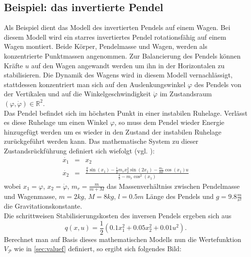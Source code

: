 \documentclass[12pt,a4paper,twoside]{article}
\begin{document}
	\subsection{Beispiel: das invertierte Pendel}
	Als Beispiel dient das Modell des invertierten Pendels auf einem Wagen. Bei diesem Modell wird ein starres 
	invertiertes Pendel rotationsfähig auf einem Wagen montiert. Beide Körper, Pendelmasse und Wagen, werden als 
	konzentrierte Punktmassen angenommen. Zur Balancierung des Pendels können Kräfte $u$ auf den Wagen angewandt 
	werden um ihn in der Horizontalen zu stabilisieren. Die Dynamik des Wagens wird in diesem Modell vernachlässigt, 
	stattdessen konzentriert man sich auf den Auslenkungswinkel $\varphi$ des Pendels von der Vertikalen und auf die 
	Winkelgeschwindigkeit $\dot{\varphi}$ im Zustandsraum $(\varphi,\dot{\varphi})\in \mathds{R}^2$. \\
	Das Pendel befindet sich im höchsten Punkt in einer instabilen Ruhelage. Verlässt es diese Ruhelage um einen 
	Winkel $\varphi$, so muss dem Pendel wieder Energie hinzugefügt werden um es wieder in den Zustand der instabilen 
	Ruhelage zurückgeführt werden kann. Das mathematische System zu dieser Zustandsrückführung definiert sich 
	wiefolgt (vgl. \citep{Grune2005}):
	\begin{eqnarray}
		\dot{x_1} &=& x_2 \\
		\dot{x_2} &=& \frac{\frac{g}{l}\sin (x_1)-\frac{1}{2}m_rx_2^2\sin (2x_1)-\frac{m_r}{ml}\cos (x_1)u}{\frac{4}{3}-m_r\cos ^2(x_1)}
	\end{eqnarray}
	wobei $x_1=\varphi$, $x_2=\dot{\varphi}$, $m_r=\frac{m}{m+M}$ das Massenverhältniss zwischen Pendelmasse und 
	Wagenmasse, $m=2kg$, $M=8kg$, $l=0.5m$ Länge des Pendels und $g=9.8\frac{m}{s^2}$ die Gravitationskonstante. \\
	Die schrittweisen Stabilisierungskosten des inversen Pendels ergeben sich aus
	\begin{equation}
		q(x,u)=\frac{1}{2}(0.1x_1^2+0.05x_2^2+0.01u^2).
	\end{equation}
	Berechnet man auf Basis dieses mathematischen Modells nun die Wertefunktion $V_\mathcal{P}$ wie in 
	\ref{sec:valuef} definiert, so ergibt sich folgendes Bild:
\end{document}
